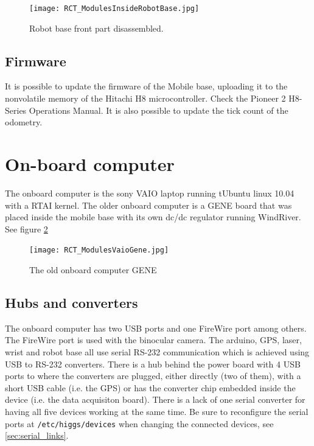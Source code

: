 \begin{figure}[htbp]
\begin{center}
 {\texttt{[image: RCT\_ModulesInsideRobotBase.jpg]}}
\end{center}
\caption{Robot base front part disassembled.}
\label{fig:ModulesInsideRobotBase}
\end{figure}


\subsection{Firmware}
It is possible to update the firmware of the Mobile base, uploading it to the nonvolatile memory of the
Hitachi H8 microcontroller. Check the Pioneer 2 H8-Series Operations Manual. It is also possible to update
the tick count of the odometry.




\section{On-board computer}
\label{sec:devmanual_pc}

The onboard computer is the sony VAIO laptop running tUbuntu linux 10.04 with a RTAI kernel. The older onboard computer is a GENE board that was placed inside the mobile base with its own dc/dc regulator running WindRiver. See figure \ref{fig:RCT_old_gene}

\begin{figure}[htbp]
\begin{center}
 {\texttt{[image: RCT\_ModulesVaioGene.jpg]}}
\end{center}
\caption{The old onboard computer GENE}
\label{fig:RCT_old_gene}
\end{figure}

\subsection{Hubs and converters}
The onboard computer has two USB ports and one FireWire port among others. The FireWire port is used with the binocular camera. The arduino, GPS, laser, wrist and robot base all use serial RS-232 communication which is achieved using USB to RS-232 converters. There is a hub behind the power board with 4 USB ports to where the converters are plugged, either directly (two of them), with a short USB cable (i.e. the GPS) or has the converter chip embedded inside the device (i.e. the data acquisiton board). There is a lack of one serial converter for having all five devices working at the same time. Be sure to reconfigure the serial ports at \texttt{/etc/higgs/devices} when changing the connected devices, see \ref{sec:serial_links}.

